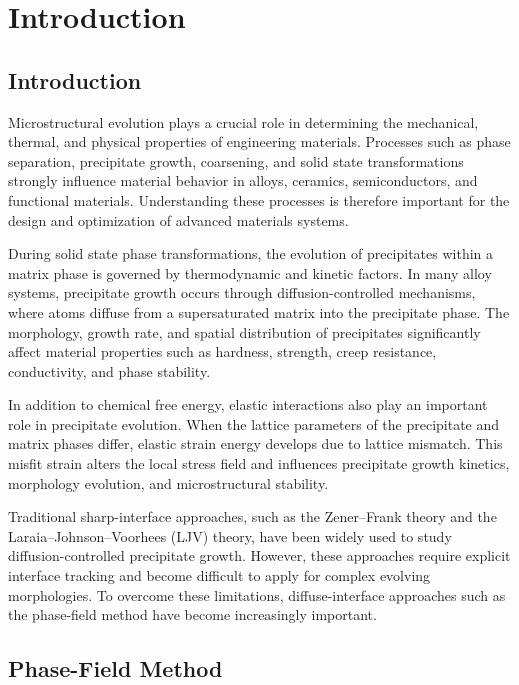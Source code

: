 \chapter{Introduction}

\section{Introduction}

Microstructural evolution plays a crucial role in determining the mechanical, thermal, and physical properties of engineering materials. Processes such as phase separation, precipitate growth, coarsening, and solid state transformations strongly influence material behavior in alloys, ceramics, semiconductors, and functional materials. Understanding these processes is therefore important for the design and optimization of advanced materials systems.

During solid state phase transformations, the evolution of precipitates within a matrix phase is governed by thermodynamic and kinetic factors. In many alloy systems, precipitate growth occurs through diffusion-controlled mechanisms, where atoms diffuse from a supersaturated matrix into the precipitate phase. The morphology, growth rate, and spatial distribution of precipitates significantly affect material properties such as hardness, strength, creep resistance, conductivity, and phase stability.

In addition to chemical free energy, elastic interactions also play an important role in precipitate evolution. When the lattice parameters of the precipitate and matrix phases differ, elastic strain energy develops due to lattice mismatch. This misfit strain alters the local stress field and influences precipitate growth kinetics, morphology evolution, and microstructural stability.

Traditional sharp-interface approaches, such as the Zener–Frank theory and the Laraia–Johnson–Voorhees (LJV) theory, have been widely used to study diffusion-controlled precipitate growth. However, these approaches require explicit interface tracking and become difficult to apply for complex evolving morphologies. To overcome these limitations, diffuse-interface approaches such as the phase-field method have become increasingly important.

\section{Phase-Field Method}


